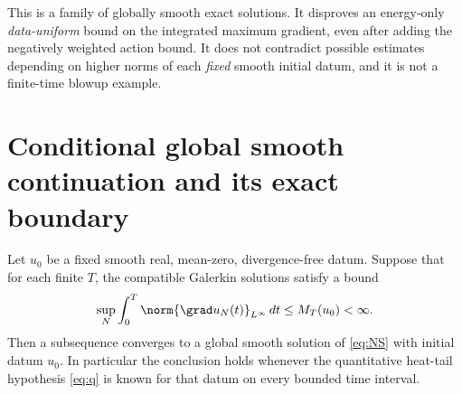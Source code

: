 \begin{remark}
This is a family of globally smooth exact solutions. It disproves an energy-only \emph{data-uniform} bound on the integrated maximum gradient, even after adding the negatively weighted action bound. It does not contradict possible estimates depending on higher norms of each \emph{fixed} smooth initial datum, and it is not a finite-time blowup example.
\end{remark}

\section{Conditional global smooth continuation and its exact boundary}
\begin{theorem}\label{thm:conditional}
Let $u_0$ be a fixed smooth real, mean-zero, divergence-free datum. Suppose that for each finite $T$, the compatible Galerkin solutions satisfy a bound
\begin{equation}\label{eq:goal}
\sup_N\int_0^T\norm{\grad u_N(t)}_{L^\infty}\,dt\le M_T(u_0)<\infty.
\end{equation}
Then a subsequence converges to a global smooth solution of \eqref{eq:NS} with initial datum $u_0$. In particular the conclusion holds whenever the quantitative heat-tail hypothesis \eqref{eq:q} is known for that datum on every bounded time interval.
\end{theorem}
